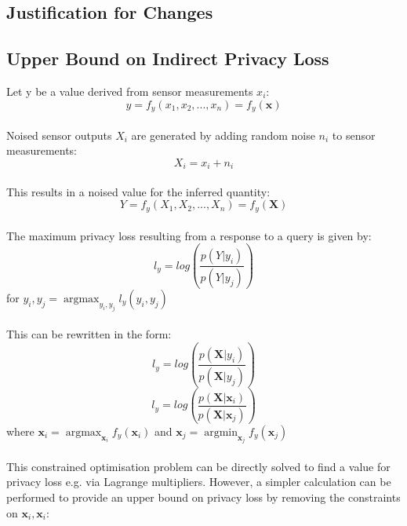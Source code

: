 \documentclass[pageno]{jpaper}
\DeclareMathOperator*{\argmax}{argmax}
\DeclareMathOperator*{\argmin}{argmin}
\begin{document}
\subsection{Justification for Changes}

\begin{appendices}
\section{Upper Bound on Indirect Privacy Loss}
\label{appendix:upper_bound}
Let y be a value derived from sensor measurements $x_i$:
\begin{equation} \label{eqn:ub_y}
  y = f_y(x_1, x_2,..., x_n) = f_y(\mathbf{x})
\end{equation}
\\
Noised sensor outputs $X_i$ are generated by adding random noise $n_i$ to sensor measurements:
\begin{equation} \label{eqn:ub_X_i}
  X_i = x_i + n_i
\end{equation}
\\
This results in a noised value for the inferred quantity:
\begin{equation} \label{eqn:ub_Y}
  Y = f_y(X_1, X_2,..., X_n) = f_y(\mathbf{X})
\end{equation}
\\
The maximum privacy loss resulting from a response to a query is given by\cite{Choi2018GuaranteeingLD}:
\begin{equation} \label{eqn:ub_l_y}
  l_y = log\left( \frac{p(Y|y_i)}{p(Y|y_j)} \right)
\end{equation}
for $y_i, y_j = \argmax_{y_i, y_j} l_y(y_i, y_j)$
\\\\
This can be rewritten in the form:
\begin{equation} \label{eqn:ub_l_y_2}
  l_y = log\left( \frac{p(\mathbf{X}|y_i)}{p(\mathbf{X}|y_j)} \right) \nonumber
\end{equation}
\begin{equation} \label{eqn:ub_l_y_constrained}
  l_y = log\left( \frac{p(\mathbf{X}|\mathbf{x}_i)}{p(\mathbf{X}|\mathbf{x}_j)} \right)
\end{equation}
where $\mathbf{x}_i = \argmax_{\mathbf{x}_i} f_y(\mathbf{x}_i)$ and $\mathbf{x}_j = \argmin_{\mathbf{x}_j} f_y(\mathbf{x}_j)$
\\\\
This constrained optimisation problem can be directly solved to find a value for privacy loss e.g. via Lagrange multipliers. However, a simpler calculation can be performed to provide an upper bound on privacy loss by removing the constraints on $\mathbf{x}_i, \mathbf{x}_i$:

\end{appendices}
\end{document}
